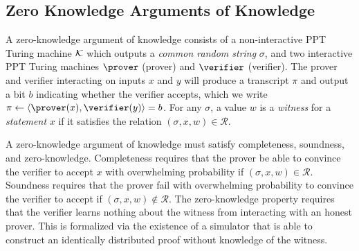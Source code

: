 \subsection{Zero Knowledge Arguments of Knowledge}

A zero-knowledge argument of knowledge consists of a non-interactive PPT Turing
machine $\mathcal{K}$ which outputs a \emph{common random string} $\sigma$, and two interactive PPT Turing machines $\prover$ (prover) and $\verifier$ (verifier).
The prover and verifier interacting on inputs $x$ and $y$ will
produce a transcript $\pi$ and output a bit $b$ indicating whether the verifier accepts, which we write $\pi \gets
\ip{\prover(x)}{\verifier(y)} = b$.
For any $\sigma$, a value $w$ is a \emph{witness} for a \emph{statement} $x$ if it
satisfies the relation $(\sigma, x, w) \in \mathcal{R}$.

A zero-knowledge argument of knowledge must satisfy completeness, soundness, and zero-knowledge.
Completeness requires that the
prover be able to convince the verifier to accept $x$ with overwhelming probability
if $(\sigma, x, w) \in \mathcal{R}$.
Soundness requires that the prover fail with
overwhelming probability to convince the verifier to accept if $(\sigma, x, w) \notin
\mathcal{R}$.
The zero-knowledge property requires
that the verifier learns nothing about the witness from
interacting with an honest prover. This is formalized via the
existence of a simulator that is able to
construct an identically distributed proof without knowledge of the witness.

